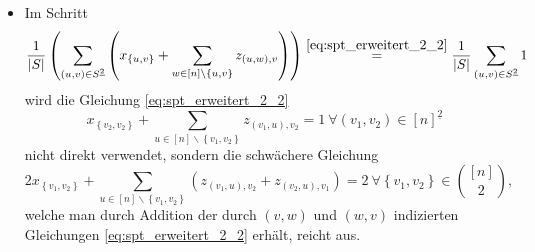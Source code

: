 \documentclass[10p,a4paper,BCOR = 12mm, DIV=15]{scrbook}
\begin{document}
{\begin{itemize}
Der entsprechende Schritt im Beweis sieht dann folgendermaßen aus:
\begin{eqnarray*}
\frac{1}{\left|S\right|} \left(\sum_{\left(u, v, w\right) \in S^{\underline{3}}} z_{\left(u, v\right), w} + \sum_{\left(u, v\right) \in S^{\underline{2}}} x_{\left\{u, v\right\}} \right) & = & \frac{1}{\left|S\right|} \left(
\sum_{v \in S} \sum_{\left(u, w\right) \in \left(S \backslash \left\{v\right\}\right)^{\underline{2}}} z_{\left(u, v\right), w} + \sum_{\left(u, v\right) \in S^{\underline{2}}} x_{\left\{u, v\right\}} \right) \\
& = & \frac{1}{\left|S\right|} \left(
\sum_{v \in S} \sum_{\left\{u, w\right\} \in {S \backslash \left\{v\right\} \choose 2}} \left(z_{\left(u, v\right), w} + z_{\left(w, v\right), u}\right) \right. \\
& & \left. + \sum_{\left(u, v\right) \in S^{\underline{2}}} x_{\left\{u, v\right\}} \right) \\
& \stackrel{\eqref{eq:erw_symm_eq_z}}{\leq} & \frac{1}{\left|S\right|} \left(
\sum_{v \in \left[n\right]} \sum_{\left\{u, w\right\} \in {S \backslash \left\{v\right\} \choose 2}} \left(z_{\left(u, v\right), w} + z_{\left(w, v\right), u}\right) \right. \\
& & \left. + \sum_{\left(u, v\right) \in S^{\underline{2}}} x_{\left\{u, v\right\}} \right) \\
& = & \frac{1}{\left|S\right|} \sum_{\left(u, v\right) \in S^{\underline{2}}} \left( x_{\left\{u, v\right\}} + \sum_{w \in \left[n\right] \backslash \left\{u, v\right\}} z_{\left(u, w\right), v} 
\right).
\end{eqnarray*}
\item Im Schritt
\begin{displaymath}
\frac{1}{\left|S\right|} \left(\sum_{\left(u, v\right) \in S^{\underline{2}}} \left( x_{\left\{u, v\right\}} + \sum_{w \in \left[n\right] \backslash \left\{u, v\right\}} z_{\left(u, w\right), v} 
\right)\right)
\stackrel{\eqref{eq:spt_erweitert_2_2}}{=}
\frac{1}{\left|S\right|} \sum_{\left(u, v\right) \in S^{\underline{2}}} 1
\end{displaymath}
wird die Gleichung \eqref{eq:spt_erweitert_2_2}
\begin{displaymath}
x_{\left\{v_2, v_2\right\}} + \sum_{u\in[n]\backslash\left\{v_1, v_2\right\}} z_{\left(v_1, u\right), v_2} = 1\ \forall \left(v_1, v_2\right)\in [n]^{\underline{2}}
\end{displaymath}
nicht direkt verwendet, sondern die schwächere Gleichung
\begin{equation}
2 x_{\left\{v_1, v_2\right\}} + \sum_{u\in[n]\backslash\left\{v_1, v_2\right\}} \left(z_{\left(v_1, u\right), v_2} + z_{\left(v_2, u\right), v_1} \right) = 2\ \forall \left\{v_1, v_2\right\}\in {[n] \choose 2}, \label{eq:erw_symm_eq_neu2}
\end{equation}
welche man durch Addition der durch $\left(v, w\right)$ und $\left(w, v\right)$ indizierten Gleichungen \eqref{eq:spt_erweitert_2_2} erhält, reicht aus.


\end{itemize}}
\end{document}
